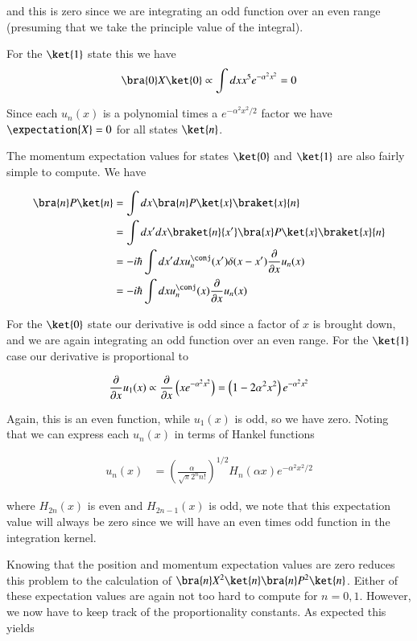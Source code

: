 and this is zero since we are integrating an odd function over an even range (presuming that we take the principle value of the integral).

For the $\ket{1}$ state this we have
\begin{align*}
\bra{0} X \ket{0} 
\propto
\int dx x^5 e^{-\alpha^2 x^2} 
= 0
\end{align*}

Since each $u_n(x)$ is a polynomial times a $e^{-\alpha^2 x^2/2}$ factor we have $\expectation{X} = 0$ for all states $\ket{n}$.

The momentum expectation values for states $\ket{0}$ and $\ket{1}$ are also fairly simple to compute.  We have

\begin{align*}
\bra{n} P \ket{n} 
&=
\int dx \bra{n} P \ket{x}\braket{x}{n} \\
&=
\int dx' dx \braket{n}{x'} \bra{x} P \ket{x} \braket{x}{n} \\
&=
-i \hbar \int dx' dx u_n^\conj(x') \delta(x-x') \PD{x}{} u_n(x) \\
&=
-i \hbar \int dx u_n^\conj(x) \PD{x}{} u_n(x) \\
\end{align*}

For the $\ket{0}$ state our derivative is odd since a factor of $x$ is brought down, and we are again integrating an odd function over an even range.  For the $\ket{1}$ case our derivative is proportional to

\begin{align*}
\frac{\partial {}}{\partial {x}} u_1(x) 
\propto
\frac{\partial {}}{\partial {x}} \left( x e^{-\alpha^2 x^2 } \right)
=
\left( 1 -2 \alpha^2 x^2 \right) e^{-\alpha^2 x^2 } 
\end{align*}

Again, this is an even function, while $u_1(x)$ is odd, so we have zero.  Noting that we can express each $u_n(x)$ in terms of Hankel functions

\begin{align}\label{eqn:desaiCh9:302}
u_n(x) &= \left( \frac{ \alpha}{\sqrt{\pi} 2^n n!} \right)^{1/2} H_n(\alpha x) e^{ -\alpha^2 x^2/2}
\end{align}

where $H_{2n}(x)$ is even and $H_{2n-1}(x)$ is odd, we note that this expectation value will always be zero since we will have an even times odd function in the integration kernel.

Knowing that the position and momentum expectation values are zero reduces this problem to the calculation of $\bra{n} X^2 \ket{n} \bra{n} P^2 \ket{n}$.  Either of these expectation values are again not too hard to compute for $n=0,1$.  However, we now have to keep track of the proportionality constants.  As expected this yields

